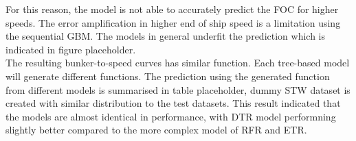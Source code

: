 For this reason, the model is not able to accurately predict the FOC for higher speeds. The error amplification in higher end of ship speed is a limitation using the sequential GBM. The models in general underfit the prediction which is indicated in figure placeholder.\\

The resulting bunker-to-speed curves has similar function. Each tree-based model will generate different functions. The prediction using the generated function from different models is summarised in table placeholder, dummy STW dataset is created with similar distribution to the test datasets. This result indicated that the models are almost identical in performance, with DTR model performning slightly better compared to the more complex model of RFR and ETR.\\










